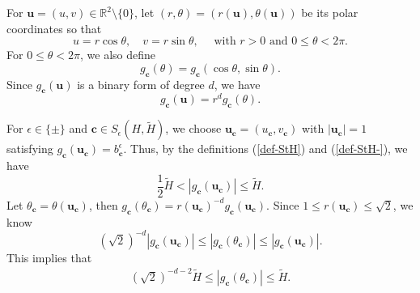 \documentclass[reqno, 11pt]{amsart}
\renewcommand{\leq}{\leqslant}
\theoremstyle{definition}
\theoremstyle{definition}
\renewcommand{\leq}{\leqslant}
\newcommand{\RR}{\mathbb{R}}
\newcommand{\cc}{\mathbf{c}}
\newcommand{\uu}{\mathbf{u}}
\numberwithin{equation}{section}
\begin{document}
For $\uu = (u, v) \in \RR^2 \setminus \{0\}$, let $(r, \theta) = (r(\uu), \theta(\uu))$ be its polar coordinates so that
$$u = r \cos \theta, \quad v = r \sin \theta, \quad \text{ with } r > 0 \text{ \ and \ }  0 \leq \theta < 2\pi.$$ 
For $0 \leq \theta < 2\pi$, we also define
$$g_\cc(\theta) = g_\cc(\cos \theta, \sin \theta).$$
Since $g_\cc(\uu)$ is a binary form of degree $d$, we have
$$g_\cc(\uu) = r^d g_\cc(\theta).$$

For $\epsilon \in \{\pm\}$ and $\cc \in S_\epsilon(H, \tilde{H})$, we choose $\uu_\cc = (u_\cc, v_\cc)$ with $|\uu_\cc| = 1$ satisfying $g_\cc(\uu_\cc) = b^\epsilon_\cc$. Thus, by the definitions (\ref{def-StH}) and (\ref{def-StH-}), we have
$$\frac{1}{2}\tilde{H} < |g_\cc(\uu_\cc)| \leq \tilde{H}.$$ 
Let $\theta_\cc = \theta(\uu_\cc)$, then $g_\cc(\theta_\cc) = r(\uu_\cc)^{-d} g_\cc(\uu_\cc)$. Since $1 \leq r(\uu_\cc) \leq \sqrt{2}$, we know
$$(\sqrt{2})^{-d} |g_\cc(\uu_\cc)| \leq |g_\cc(\theta_\cc)| \leq |g_\cc(\uu_\cc)|.$$
This implies that
\begin{align}\label{theta-H}
	(\sqrt{2})^{-d-2} \tilde{H} \leq |g_\cc(\theta_\cc)| \leq \tilde{H}.
\end{align}
\end{document}

